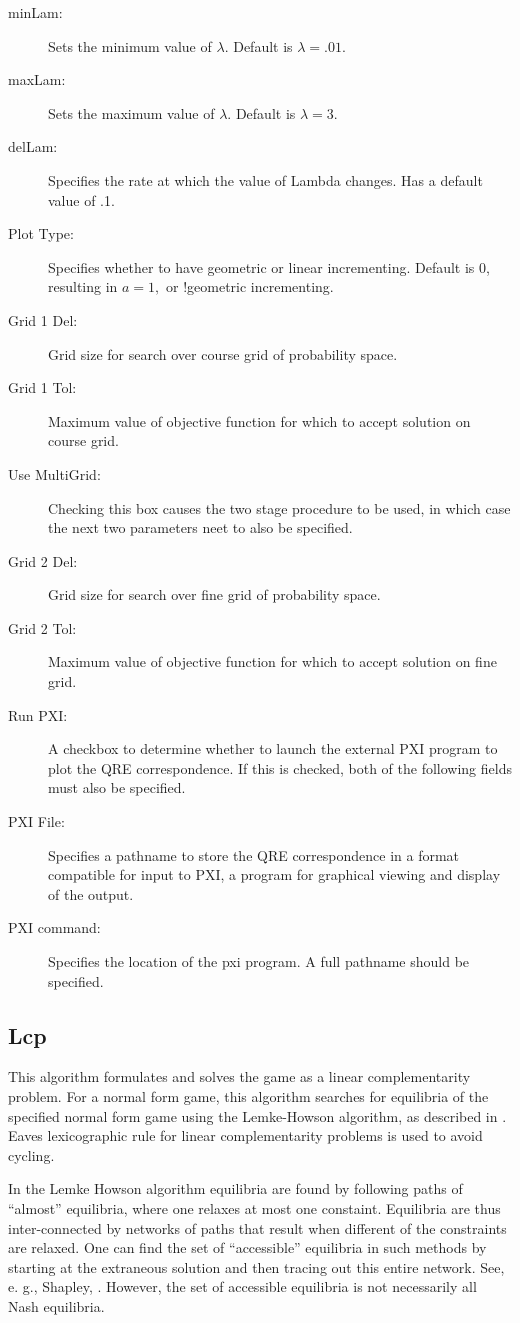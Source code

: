 \documentclass[12pt]{report}
\begin{document}
\begin{description}
\item[minLam:] Sets the minimum value of $\lambda.$
Default is $\lambda = .01.$
\item[maxLam:]  Sets the maximum value of $\lambda.$
Default is $\lambda = 3.$ 
\item[delLam:] Specifies the rate at which the value of Lambda changes.
Has a default value of .1.
\item[Plot Type:] Specifies whether to have geometric or linear incrementing.
Default is 0, resulting in $a = 1,$ or !geometric incrementing.
\item[Grid 1 Del:] Grid size for search over course grid of probability space.
\item[Grid 1 Tol:] Maximum value of objective function for which to accept
solution on course grid.
\item[Use MultiGrid:] Checking this box causes the two stage procedure
to be used, in which case the next two parameters neet to also be
specified.
\item[Grid 2 Del:] Grid size for search over fine grid of probability space.  
\item[Grid 2 Tol:] Maximum value of objective function for which to
accept solution on fine grid.
\item[Run PXI:] A checkbox to determine whether to launch the external
PXI program to plot the QRE correspondence.  If this is checked, both
of the following fields must also be specified.
\item[PXI File:] Specifies a pathname to store the QRE correspondence
in a format compatible for input to PXI, a program for graphical
viewing and display of the output.
\item[PXI command:] Specifies the location of the pxi program.  A full
pathname should be specified.
\end{description}

\subsection{Lcp}\label{Lcp}
This algorithm formulates and solves the game as a linear
complementarity problem.  For a normal form game, this algorithm
searches for equilibria of the specified normal form game using the
Lemke-Howson algorithm, as described in \cite{LemHow:64}. Eaves
\cite{Eav:71} lexicographic rule for linear complementarity problems
is used to avoid cycling.

In the Lemke Howson algorithm equilibria are found by following paths
of ``almost'' equilibria, where one relaxes at most one constaint.
Equilibria are thus inter-connected by networks of paths that result
when different of the constraints are relaxed.  One can find the set
of ``accessible'' equilibria in such methods by starting at the
extraneous solution and then tracing out this entire network.  See,
e. g., Shapley, \cite{Sha:74}.  However, the set of accessible
equilibria is not necessarily all Nash equilibria.
\end{document}

